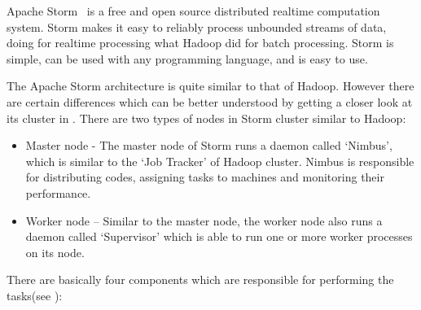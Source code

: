 Apache Storm~\cite{misc:ApacheStorm} is a free and open source distributed realtime computation system. Storm makes it easy to reliably process unbounded streams of data, doing for realtime processing what Hadoop did for batch processing. Storm is simple, can be used with any programming language, and is easy to use.



The Apache Storm architecture is quite similar to that of Hadoop. However there are certain differences which can be better understood by getting a closer look at its cluster in . 
There are two types of nodes in Storm cluster similar to Hadoop:
\begin{itemize}
	\item {Master node - }The master node of Storm runs a daemon called ‘Nimbus’, which is similar to the ‘Job Tracker’ of Hadoop cluster. Nimbus is responsible for distributing codes, assigning tasks to machines and monitoring their performance.
	\item {Worker node – }Similar to the master node, the worker node also runs a daemon called ‘Supervisor’ which is able to run one or more worker processes on its node. %
\end{itemize}
There are basically four components which are responsible for performing the tasks(see  ):

